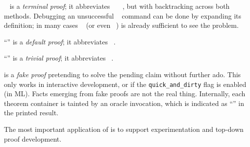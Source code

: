 \begin{isabellebody}
\begin{isamarkuptext}
\begin{descr}
  \item [\hyperlink{command.by}{\mbox{\isa{\isacommand{by}}}}~\isa{{\isachardoublequote}m\isactrlsub {\isadigit{1}}\ m\isactrlsub {\isadigit{2}}{\isachardoublequote}}] is a
  \emph{terminal proof}; it abbreviates
  \hyperlink{command.proof}{\mbox{}}~~~, but with backtracking across both methods.  Debugging
  an unsuccessful \hyperlink{command.by}{\mbox{}}~
  command can be done by expanding its definition; in many cases
  \hyperlink{command.proof}{\mbox{}}~ (or even ~) is already sufficient to see the
  problem.

  \item [``\hyperlink{command.ddot}{\mbox{\isa{\isacommand{{\isachardot}{\isachardot}}}}}''] is a \emph{default
  proof}; it abbreviates \hyperlink{command.by}{\mbox{}}~.

  \item [``\hyperlink{command.dot}{\mbox{\isa{\isacommand{{\isachardot}}}}}''] is a \emph{trivial
  proof}; it abbreviates \hyperlink{command.by}{\mbox{}}~.
  
  \item [\hyperlink{command.sorry}{\mbox{\isa{\isacommand{sorry}}}}] is a \emph{fake proof}
  pretending to solve the pending claim without further ado.  This
  only works in interactive development, or if the \verb|quick_and_dirty| flag is enabled (in ML).  Facts emerging from fake
  proofs are not the real thing.  Internally, each theorem container
  is tainted by an oracle invocation, which is indicated as ``\isa{{\isachardoublequote}{\isacharbrackleft}{\isacharbang}{\isacharbrackright}{\isachardoublequote}}'' in the printed result.
  
  The most important application of \hyperlink{command.sorry}{\mbox{}} is to support
  experimentation and top-down proof development.


\end{descr}
\end{isamarkuptext}
\end{isabellebody}
